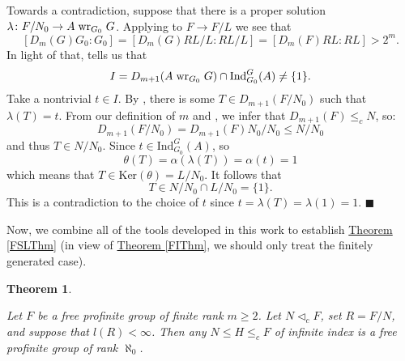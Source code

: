 \documentclass[12pt,a4paper]{article}
\newtheorem{theorem}{Theorem}[section]
\newenvironment{proof}[1][Proof]{\begin{trivlist}
\item[\hskip \labelsep {\bfseries #1}]}{\end{trivlist}}
\newcommand{\thmref}[1]{\hyperref[#1]{Theorem \ref*{#1}}}
\begin{document}
\begin{proof}
Towards a contradiction, suppose that there is a proper solution $\lambda \colon F/N_0 \rightarrow A \hspace{1mm} \text{wr}_{G_0} \hspace{1mm} G$. Applying \cite[Lemma 2.7 (1)]{BFW} to $F \to F/L$ we see that $$[D_m(G)G_0 : G_0] = [D_m(G)RL/L : RL/L] = [D_m(F)RL : RL] > 2^m.$$ In light of that, \cite[Proposition 2.11]{BFW} tells us that $$I = D_{m+1}(A \hspace{1mm} \text{wr}_{G_0} \hspace{1mm} G) \cap \text{Ind}_{G_0}^{G}(A) \neq \{1\}.$$ Take a nontrivial $t \in I$. By \cite[Lemma 2.7 (1)]{BFW}, there is some $T \in D_{m+1}(F/N_0)$ such that $\lambda(T) = t$. From our definition of $m$ and \cite[Lemma 2.7 (1)]{BFW}, we infer that $D_{m+1}(F) \leq_c N$, so: $$ D_{m+1}(F/N_0) = D_{m+1}(F)N_0/N_0 \leq N/N_0$$ and thus $T \in N/N_0$. Since $t \in \text{Ind}_{G_0}^G(A)$, so $$\theta(T) = \alpha(\lambda(T)) = \alpha(t) = 1$$ which means that $T \in \text{Ker}(\theta) = L/N_0$. It follows that $$T \in N/N_0 \cap L/N_0 = \{1\}.$$ This is a contradiction to the choice of $t$ since $t = \lambda(T) = \lambda(1) = 1$. $\blacksquare$

\end{proof}

Now, we combine all of the tools developed in this work to establish \thmref{FSLThm} (in view of \thmref{FIThm}, we should only treat the finitely generated case).

\begin{theorem} \label{FFSLThm}

Let $F$ be a free profinite group of finite rank $m\geq2$. Let $N \lhd_c F$, set $R = F/N$, and suppose that $l(R) < \infty$. Then any $N \leq H \leq_c F$ of infinite index is a free profinite group of rank $\aleph_0$.

\end{theorem}
\end{document}
